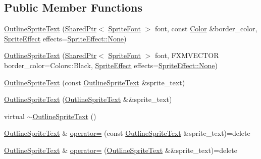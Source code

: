 \subsection*{Public Member Functions}
\begin{DoxyCompactItemize}
\item 
\hyperlink{classmage_1_1_outline_sprite_text_a005afe0bf463128c91d609afe4e63641}{Outline\+Sprite\+Text} (\hyperlink{namespacemage_a1e01ae66713838a7a67d30e44c67703e}{Shared\+Ptr}$<$ \hyperlink{classmage_1_1_sprite_font}{Sprite\+Font} $>$ font, const \hyperlink{structmage_1_1_color}{Color} \&border\+\_\+color, \hyperlink{namespacemage_a9cfe18123066ba4236f548f9de75d881}{Sprite\+Effect} effects=\hyperlink{namespacemage_a5e7e18b0154373ce8fc942fe3f6b27fda6adf97f83acf6453d4a6a4b1070f3754}{Sprite\+Effect\+::\+None})
\item 
\hyperlink{classmage_1_1_outline_sprite_text_a75b74158c4484d1ee0a46c653eaef67b}{Outline\+Sprite\+Text} (\hyperlink{namespacemage_a1e01ae66713838a7a67d30e44c67703e}{Shared\+Ptr}$<$ \hyperlink{classmage_1_1_sprite_font}{Sprite\+Font} $>$ font, F\+X\+M\+V\+E\+C\+T\+OR border\+\_\+color=Colors\+::\+Black, \hyperlink{namespacemage_a9cfe18123066ba4236f548f9de75d881}{Sprite\+Effect} effects=\hyperlink{namespacemage_a5e7e18b0154373ce8fc942fe3f6b27fda6adf97f83acf6453d4a6a4b1070f3754}{Sprite\+Effect\+::\+None})
\item 
\hyperlink{classmage_1_1_outline_sprite_text_a15be7f23a00e893314b905d5385903c5}{Outline\+Sprite\+Text} (const \hyperlink{classmage_1_1_outline_sprite_text}{Outline\+Sprite\+Text} \&sprite\+\_\+text)
\item 
\hyperlink{classmage_1_1_outline_sprite_text_a86bb6e1637bcc71a4272f193466669e2}{Outline\+Sprite\+Text} (\hyperlink{classmage_1_1_outline_sprite_text}{Outline\+Sprite\+Text} \&\&sprite\+\_\+text)
\item 
virtual \hyperlink{classmage_1_1_outline_sprite_text_ae4d77ebb3f5bac4fd02b148d6173d10f}{$\sim$\+Outline\+Sprite\+Text} ()
\item 
\hyperlink{classmage_1_1_outline_sprite_text}{Outline\+Sprite\+Text} \& \hyperlink{classmage_1_1_outline_sprite_text_a324ec8e5c0d319b449895cc45d6b3807}{operator=} (const \hyperlink{classmage_1_1_outline_sprite_text}{Outline\+Sprite\+Text} \&sprite\+\_\+text)=delete
\item 
\hyperlink{classmage_1_1_outline_sprite_text}{Outline\+Sprite\+Text} \& \hyperlink{classmage_1_1_outline_sprite_text_a3549e97af5461728a399f01af9125486}{operator=} (\hyperlink{classmage_1_1_outline_sprite_text}{Outline\+Sprite\+Text} \&\&sprite\+\_\+text)=delete

\end{DoxyCompactItemize}
